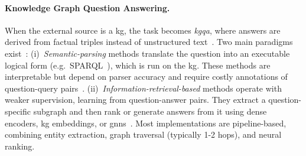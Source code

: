 \paragraph{Knowledge Graph Question Answering.}
When the external source is a \acl{kg}, the task becomes \emph{\acf{kgqa}}, where answers are derived from factual triples instead of unstructured text~\cite{lan2022complex}. Two main paradigms exist~\cite{lan2022complex}:  
(i)~\emph{Semantic-parsing} methods translate the question into an executable logical form (e.g.\ SPARQL~\cite{prudhommeaux2008sparql}), which is run on the \ac{kg}. These methods are interpretable but depend on parser accuracy and require costly annotations of question-query pairs~\cite{li-etal-2025-decoding-graphs,mavromatis-karypis-2025-gnn}.  
(ii)~\emph{Information-retrieval-based} methods operate with weaker supervision, learning from question-answer pairs. They extract a question-specific subgraph and then rank or generate answers from it using dense encoders, \ac{kg} embeddings, or \acp{gnn}~\cite{lan2022complex,ZHANG2022102933}. Most implementations are pipeline-based, combining entity extraction, graph traversal (typically 1-2 hops), and neural ranking.




